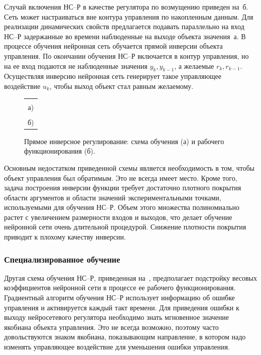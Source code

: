 Случай включения НС--Р в качестве регулятора по возмущению приведен
на~б.  Сеть может настраиваться вне контура
управления по накопленным данным.  Для реализации динамических свойств
предлагается подавать параллельно на вход НС--Р задержанные во времени
наблюденные на выходе объекта значения~а.  В
процессе обучения нейронная сеть обучается прямой инверсии объекта
управления.  По окончании обучения НС--Р включается в контур
управления, но на ее вход подаются не наблюденные значения
$y_k,y_{k-1}$, а желаемые $r_k,r_{k-1}$.  Осуществляя инверсию
нейронная сеть генерирует такое управляющее воздействие $u_k$, чтобы
выход объект стал равным желаемому.

\begin{figure}[h]
\centering
\begin{tabular}{c}
\hbox{} \\
а) \\
\hbox{} \\
б)\\
\end{tabular}
\caption{Прямое инверсное регулирование: схема обучения (а)
         и рабочего функционирования (б).}
\label{fig:direct_nnc}
\end{figure}

Основным недостатком приведенной схемы является необходимость в том,
чтобы объект управления был обратимым.  Это не всегда имеет место.
Кроме того, задача построения инверсии функции требует достаточно
плотного покрытия области аргументов и области значений
экспериментальными точками, используемыми для обучения НС--Р.  Объем
этого множества полиномиально растет с увеличением размерности входов
и выходов, что делает обучение нейронной сети очень длительной
процедурой.  Снижение плотности покрытия приводит к плохому качеству
инверсии.

\subsubsection{Специализированное обучение}

Другая схема обучения НС--Р, приведенная на~,
предполагает подстройку весовых коэффициентов нейронной сети в
процессе ее рабочего функционирования.  Градиентный алгоритм обучения
НС--Р использует информацию об ошибке управления и активируется каждый
такт времени.  Для приведения ошибки к выходу нейросетевого регулятора
необходимо знать мгновенное значение якобиана объекта управления.  Это
не всегда возможно, поэтому часто довольствуются знаком якобиана,
показывающим направление, в котором надо изменять управляющее
воздействие для уменьшения ошибки управления.

